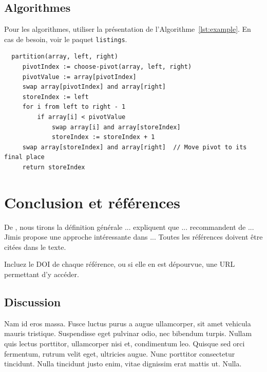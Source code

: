 \documentclass[jimisdraft]{jimis-fr}
\begin{document}
\subsection{Algorithmes}
Pour les algorithmes, utiliser la présentation de l'Algorithme~\ref{lst:example}. En cas de besoin, voir le paquet \texttt{listings}.

\begin{listing}
  \begin{lstlisting}
  partition(array, left, right)
     pivotIndex := choose-pivot(array, left, right)
     pivotValue := array[pivotIndex]
     swap array[pivotIndex] and array[right]
     storeIndex := left
     for i from left to right - 1
         if array[i] < pivotValue
             swap array[i] and array[storeIndex]
             storeIndex := storeIndex + 1
     swap array[storeIndex] and array[right]  // Move pivot to its final place
     return storeIndex
  \end{lstlisting}
  \caption{Fonction de partition d'un algorithme de tri.}
  \label{lst:example}
\end{listing}





\section{Conclusion et références}
De \cite{sinclair91corpus}, nous tirons la définition générale ... \cite{ounis00flidar} expliquent que ... \cite{wood92artifacts} recommandent de ... Jimis propose une approche intéressante dans \cite{jimis} ... Toutes les références doivent être citées dans le texte.

Incluez le DOI de chaque référence, ou si elle en est dépourvue, une URL permettant d'y accéder.

\nocite{hentschel07acceptance,biodiversa,pubmed,antonymy02perspective,justeson01cooccurence,r-project,perotti2015,petrone:hal-01191886}


\subsection{Discussion}
Nam id eros massa. Fusce luctus purus a augue ullamcorper, sit amet vehicula mauris tristique. Suspendisse eget pulvinar odio, nec bibendum turpis. Nullam quis lectus porttitor, ullamcorper nisi et, condimentum leo. Quisque sed orci fermentum, rutrum velit eget, ultricies augue. Nunc porttitor consectetur tincidunt. Nulla tincidunt justo enim, vitae dignissim erat mattis ut. Nulla.
\end{document}
